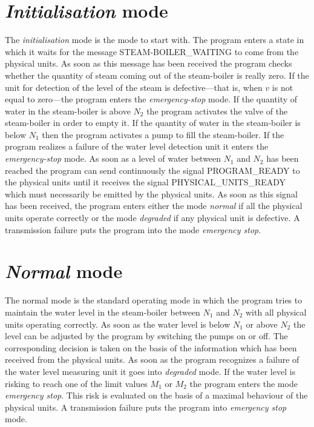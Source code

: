 \documentclass{report}
\begin{document}
\section{\emph{Initialisation} mode}

The \emph{initialisation} mode is the mode to start with.  The program
enters a state in which it waits for the message STEAM-BOILER\_WAITING
to come from the physical units.  As soon as this message has been
received the program checks whether the quantity of steam coming out
of the steam-boiler is really zero.  If the unit for detection of the
level of the steam is defective---that is, when \( v \)\/ is not equal
to zero---the program enters the \emph{emergency-stop} mode.  If the
quantity of water in the steam-boiler is above \( N_2 \)\/ the program
activates the valve of the steam-boiler in order to empty it.  If the
quantity of water in the steam-boiler is below \( N_1 \)\/ then the
program activates a pump to fill the steam-boiler.  If the program
realizes a failure of the water level detection unit it enters the
\emph{emergency-stop} mode.  As soon as a level of water between \(
N_1 \)\/ and \( N_2 \)\/ has been reached the program can send
continuously the signal PROGRAM\_READY to the physical units until it
receives the signal PHYSICAL\_UNITS\_READY which must necessarily be
emitted by the physical units.  As soon as this signal has been
received, the program enters either the mode \emph{normal} if all the
physical units operate correctly or the mode \emph{degraded} if any
physical unit is defective.  A transmission failure puts the program
into the mode \emph{emergency stop}.

\section{\emph{Normal} mode}

The normal mode is the standard operating mode in which the program
tries to maintain the water level in the steam-boiler between \(N_1
\)\/ and \( N_2 \)\/ with all physical units operating correctly.  As
soon as the water level is below \( N_1 \)\/ or above \( N_2 \)\/ the
level can be adjusted by the program by switching the pumps on or off.
The corresponding decision is taken on the basis of the information
which has been received from the physical units.  As soon as the
program recognizes a failure of the water level measuring unit it goes
into \emph{degraded} mode.  If the water level is risking to reach one
of the limit values \( M_1 \)\/ or \( M_2 \)\/ the program enters the
mode \emph{emergency stop}.  This risk is evaluated on the basis of a
maximal behaviour of the physical units.  A transmission failure puts
the program into \emph{emergency stop} mode.
\end{document}
